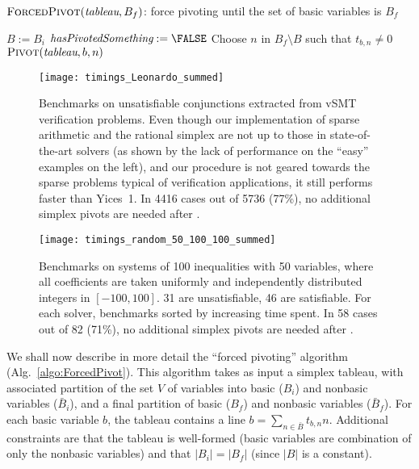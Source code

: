 \begin{algorithm}
\caption{$\textsc{ForcedPivot}(\textit{tableau}, B_f)$: force pivoting until the set of basic variables is $B_f$}
\label{algo:ForcedPivot}
\begin{algorithmic}
\STATE $B := B_i$
\REPEAT
  \STATE $\textit{hasPivotedSomething} := \FALSE$
      \STATE Choose $n$ in $B_f \setminus B$ such that $t_{b,n} \neq 0$
      \STATE $\textsc{Pivot}(\textit{tableau}, b, n)$ 
    \ENDIF
  \ENDFOR
{}
\end{algorithmic}
\end{algorithm}

\begin{figure}[htb]
\begin{center}
\texttt{[image: timings\_Leonardo\_summed]}
\end{center}
\caption{\footnotesize Benchmarks on unsatisfiable conjunctions extracted from vSMT verification problems. Even though our implementation of sparse arithmetic and the rational simplex are not up to those in state-of-the-art solvers (as shown by the lack of performance on the ``easy'' examples on the left), and our procedure is not geared towards the sparse problems typical of verification applications, it still performs faster than Yices~1. In 4416 cases out of 5736 (77\%), no additional simplex pivots are needed after .
}
\label{fig:benchmarks_Leonardo}
\end{figure}

\begin{figure}[htb]
\begin{center}
\texttt{[image: timings\_random\_50\_100\_100\_summed]}
\end{center}
\caption{\footnotesize Benchmarks on systems of 100 inequalities with 50 variables, where all coefficients are taken uniformly and independently distributed integers in $[-100,100]$. 31 are unsatisfiable, 46 are satisfiable. For each solver, benchmarks sorted by increasing time spent. In 58 cases out of 82 (71\%), no additional simplex pivots are needed after .}
\label{fig:benchmarks_random_50_100_100}
\end{figure}

We shall now describe in more detail the ``forced pivoting'' algorithm (Alg.~\ref{algo:ForcedPivot}). This algorithm takes as input a simplex tableau, with associated partition of the set $V$ of variables into basic ($B_i$) and nonbasic variables ($\bar{B}_i$), and a final partition of basic ($B_f$) and nonbasic variables ($\bar{B}_f$). For each basic variable $b$, the tableau contains a line $b = \sum_{n \in \bar{B}} t_{b,n} n$.
Additional constraints are that the tableau is well-formed (basic variables are combination of only the nonbasic variables) and that $|B_i|=|B_f|$ (since $|B|$ is a constant).

